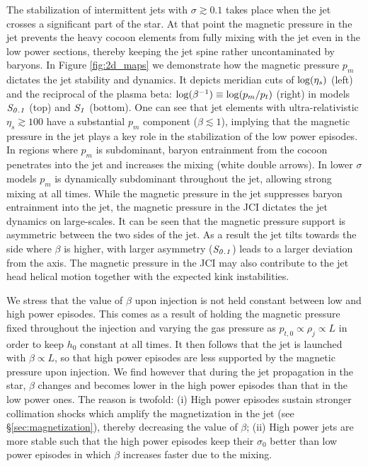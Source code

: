 \documentclass[fleqn,usenatbib]{mnras}
\newcommand{\Sa}{{\it S_{0.1}}}
\newcommand{\Sb}{{\it S_{1}}}
\begin{document}
	The stabilization of intermittent jets with $ \sigma \gtrsim 0.1 $ takes place when the jet crosses a significant part of the star. At that point the magnetic pressure in the jet prevents the heavy cocoon elements from fully mixing with the jet even in the low power sections, thereby keeping the jet spine rather uncontaminated by baryons.
	In Figure \ref{fig:2d_maps} we demonstrate how the magnetic pressure $ p_m $ dictates the jet stability and dynamics. It depicts meridian cuts of ${\rm log}(\eta_s)$ (left) and the reciprocal of the plasma beta: ${\rm log}(\beta^{-1})\equiv{\rm log}(p_m/p_t)$ (right) in models $ \Sa $ (top) and $ \Sb $ (bottom). One can see that jet elements with ultra-relativistic $ \eta_s \gtrsim 100 $ have a substantial $ p_m $ component ($ \beta \lesssim 1 $), implying that the magnetic pressure in the jet plays a key role in the stabilization of the low power episodes. In regions where $ p_m $ is subdominant, baryon entrainment from the cocoon penetrates into the jet and increases the mixing (white double arrows).
	In lower $ \sigma $ models $ p_m $ is dynamically subdominant throughout the jet, allowing strong mixing at all times.
	While the magnetic pressure in the jet suppresses baryon entrainment into the jet, the magnetic pressure in the JCI dictates the jet dynamics on large-scales. It can be seen that the magnetic pressure support is asymmetric between the two sides of the jet. As a result the jet tilts towards the side where $ \beta $ is higher, with larger asymmetry ($ \Sa $) leads to a larger deviation from the axis. The magnetic pressure in the JCI may also contribute to the jet head helical motion together with the expected kink instabilities.
	
	We stress that the value of $ \beta $ upon injection is not held constant between low and high power episodes. This comes as a result of holding the magnetic pressure fixed throughout the injection and varying the gas pressure as $ p_{t,0} \propto \rho_j \propto L $ in order to keep $ h_0 $ constant at all times. It then follows that the jet is launched with $ \beta \propto L $, so that high power episodes are less supported by the magnetic pressure upon injection. We find however that during the jet propagation in the star, $ \beta $ changes and becomes lower in the high power episodes than that in the low power ones. The reason is twofold: (i) High power episodes sustain stronger collimation shocks which amplify the magnetization in the jet (see \S\ref{sec:magnetization}), thereby decreasing the value of $ \beta $; (ii) High power jets are more stable \citep{Gottlieb2021} such that the high power episodes keep their $ \sigma_0 $ better than low power episodes in which $ \beta $ increases faster due to the mixing.
	
\end{document}
